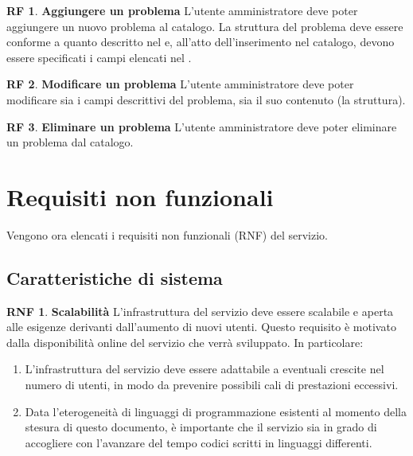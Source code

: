 \documentclass[11pt, a4paper]{article}
\theoremstyle{definition}
\newtheorem{funcreq}{RF} %
\newtheorem{nonfuncreq}{RNF} %
\begin{document}
\begin{funcreq}
\textbf{Aggiungere un problema }
L'utente amministratore deve poter aggiungere un nuovo problema al catalogo.
La struttura del problema deve essere conforme a quanto descritto nel
\textcolor{blue}{}
e, all'atto dell'inserimento nel catalogo, devono essere specificati i campi
elencati nel \textcolor{blue}{}.
\end{funcreq}

\begin{funcreq}
\textbf{Modificare un problema }
L'utente amministratore deve poter modificare sia i campi descrittivi del
problema, sia il suo contenuto (la struttura).
\end{funcreq}

\begin{funcreq}
\textbf{Eliminare un problema }
L'utente amministratore deve poter eliminare un problema dal catalogo.
\end{funcreq}

\newpage
\section{Requisiti non funzionali}
Vengono ora elencati i requisiti non funzionali (RNF) del servizio.

\subsection{Caratteristiche di sistema}

\begin{nonfuncreq}
\label{scalabilita}
\textbf{Scalabilità }
L'infrastruttura del servizio deve essere scalabile e aperta alle esigenze
derivanti dall'aumento di nuovi utenti. Questo requisito è motivato dalla
disponibilità online del servizio che verrà sviluppato. In particolare:
\begin{enumerate}
    \item L'infrastruttura del servizio deve essere adattabile a eventuali
    crescite nel numero di utenti, in modo da prevenire possibili cali di
    prestazioni eccessivi.

    \item Data l'eterogeneità di linguaggi di programmazione esistenti
    al momento della stesura di questo documento, è importante che il
    servizio sia in grado di accogliere con l'avanzare del tempo codici
    scritti in linguaggi differenti.
\end{enumerate}
\end{nonfuncreq}
\end{document}
